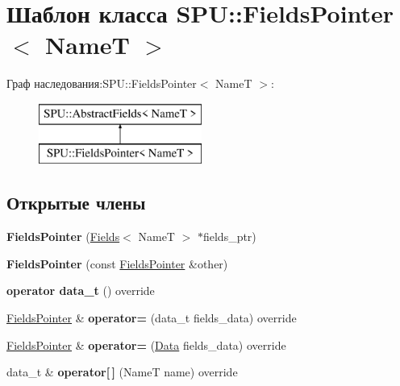 \hypertarget{class_s_p_u_1_1_fields_pointer}{}\section{Шаблон класса S\+PU\+:\+:Fields\+Pointer$<$ NameT $>$}
\label{class_s_p_u_1_1_fields_pointer}
Граф наследования\+:S\+PU\+:\+:Fields\+Pointer$<$ NameT $>$\+:\begin{figure}[H]
\begin{center}
\leavevmode
\includegraphics[height=2.000000cm]{class_s_p_u_1_1_fields_pointer}
\end{center}
\end{figure}
\subsection*{Открытые члены}
\begin{DoxyCompactItemize}
\item 
\mbox{\label{class_s_p_u_1_1_fields_pointer_a1a51ba42c450436c8822d3ec5e11d109}} 
{\bfseries Fields\+Pointer} (\hyperlink{class_s_p_u_1_1_fields}{Fields}$<$ NameT $>$ $\ast$fields\+\_\+ptr)
\item 
\mbox{\label{class_s_p_u_1_1_fields_pointer_a5aff44387a74225a711b00589573152a}} 
{\bfseries Fields\+Pointer} (const \hyperlink{class_s_p_u_1_1_fields_pointer}{Fields\+Pointer} \&other)
\item 
\mbox{\label{class_s_p_u_1_1_fields_pointer_a3107ac0f1dda9f174ba1bfe7c1f7d638}} 
{\bfseries operator data\+\_\+t} () override
\item 
\mbox{\label{class_s_p_u_1_1_fields_pointer_aaf9e024f50093b5243a49899f03b26fc}} 
\hyperlink{class_s_p_u_1_1_fields_pointer}{Fields\+Pointer} \& {\bfseries operator=} (data\+\_\+t fields\+\_\+data) override
\item 
\mbox{\label{class_s_p_u_1_1_fields_pointer_a7dd76bbfa5cfa8310c099eeb410b21ea}} 
\hyperlink{class_s_p_u_1_1_fields_pointer}{Fields\+Pointer} \& {\bfseries operator=} (\hyperlink{class_s_p_u_1_1_fields_data}{Data} fields\+\_\+data) override
\item 
\mbox{\label{class_s_p_u_1_1_fields_pointer_a810d5b91571d4137bb81963915897b91}} 
data\+\_\+t \& {\bfseries operator\mbox{[}$\,$\mbox{]}} (NameT name) override
\end{DoxyCompactItemize}
